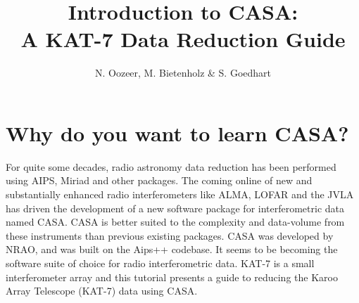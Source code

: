 \documentclass[force,almostfull,justified]{tufte-book}
\title{Introduction to CASA: \\ A KAT-7 Data Reduction Guide}
\author[Nadeem Oozeer]{N. Oozeer, M. Bietenholz \& S. Goedhart}
\begin{document}
\frontmatter

\maketitle

\vfill
{}

\tableofcontents




\mainmatter


\chapter{Why do you want to learn CASA?}
\label{ch:introduction}

For quite some decades, radio astronomy data reduction has been performed using AIPS, Miriad and other
packages.  The coming online of new and substantially enhanced radio interferometers like ALMA, LOFAR
and the JVLA has driven the development of a new software package for interferometric data named CASA.
CASA is better suited to the complexity and data-volume from these instruments than previous existing
packages.  CASA was developed by NRAO, and was built on the Aips++ codebase.  It seems to be becoming
the software suite of choice for radio interferometric data.  KAT-7 is a small interferometer array
and this tutorial presents a guide to reducing the Karoo Array Telescope (KAT-7) data using CASA.
\end{document}
